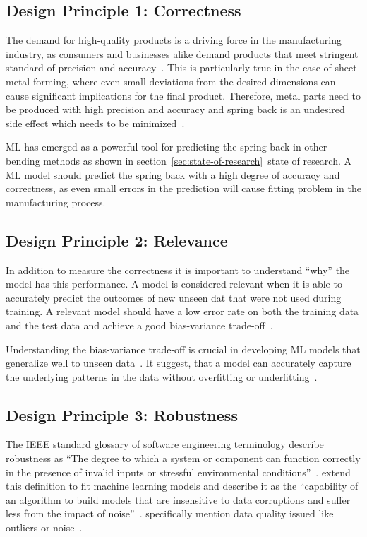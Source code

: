 \subsection*{Design Principle 1: Correctness}\label{correctness}

The demand for high-quality products is a driving force in the manufacturing industry,
as consumers and businesses alike demand products that meet stringent standard of
precision and accuracy~\cite[p. 1]{cruz_applicationmachinelearning_2021}.
This is particularly true in the case of sheet metal forming, where even small
deviations from the desired dimensions can cause significant implications for the final
product.
Therefore, metal parts need to be produced with high precision and accuracy and
spring back is an undesired side effect which needs to be
minimized~\cite[p.1]{cruz_applicationmachinelearning_2021}.

\ac{ML} has emerged as a powerful tool for predicting the spring back in other bending
methods as shown in section~\ref{sec:state-of-research}~state of research.
A \ac{ML} model should predict the spring back with a high degree of accuracy and
correctness, as even small errors in the prediction will cause fitting problem in the
manufacturing process.

\subsection*{Design Principle 2: Relevance}
In addition to measure the correctness it is important to understand ``why''
the model has this performance.
A model is considered relevant when it is able to accurately predict the outcomes of
new unseen dat that were not used during training.
A relevant model should have a low error rate on both the training data and the test
data and achieve a good bias-variance trade-off~\cite[p. 16]{siebert2022construction}.

Understanding the bias-variance trade-off is crucial in developing \ac{ML} models that
generalize well to unseen data~\cite[p. 49--51]{zhou_machinelearning_2021}.
It suggest, that a model can accurately capture the underlying patterns in the data
without overfitting or underfitting~\cite[p. 49--51]{zhou_machinelearning_2021}.

\subsection*{Design Principle 3: Robustness}

The IEEE standard glossary of software engineering terminology describe
robustness as ``The degree to which a system or component can function correctly in the presence of
invalid inputs or stressful environmental conditions''~\cite[p. 64]{terminology1990ieee}.
\cite{saez2016evaluating} extend this definition to fit machine learning
models and describe it as the ``capability of an algorithm to build models that are insensitive to
data corruptions and suffer less from the impact of noise''~\cite[p. 2]{saez_evaluatingclassifierbehavior_2016}.
\cite{siebert2022construction} specifically mention data quality issued like
outliers or noise~\cite[p. 16]{siebert2022construction}.

